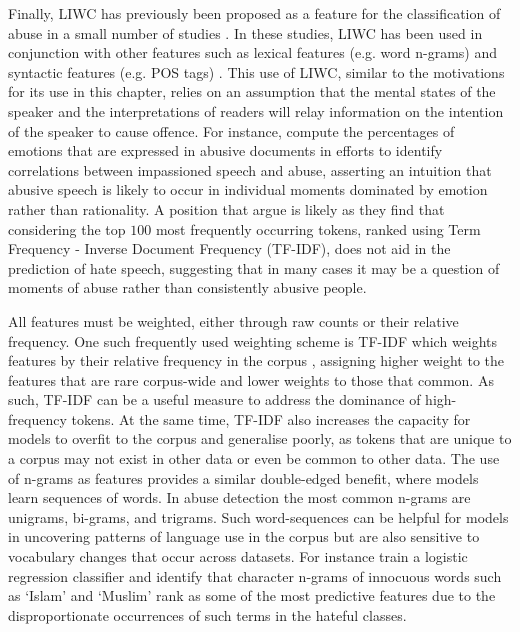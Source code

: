 Finally, LIWC has previously been proposed as a feature for the classification of abuse in a small number of studies \citep{Nina-Alcocer:2019,Joksimovic:2019}. In these studies, LIWC has been used in conjunction with other features such as lexical features (e.g. word n-grams) and syntactic features (e.g. POS tags) \citep{Joksimovic:2019}. This use of LIWC, similar to the motivations for its use in this chapter, relies on an assumption that the mental states of the speaker and the interpretations of readers will relay information on the intention of the speaker to cause offence. For instance, \citet{Nina-Alcocer:2019} compute the percentages of emotions that are expressed in abusive documents in efforts to identify correlations between impassioned speech and abuse, asserting an intuition that abusive speech is likely to occur in individual moments dominated by emotion rather than rationality. A position that \citep{Waseem:2016} argue is likely as they find that considering the top $100$ most frequently occurring tokens, ranked using Term Frequency - Inverse Document Frequency (TF-IDF), does not aid in the prediction of hate speech, suggesting that in many cases it may be a question of moments of abuse rather than consistently abusive people.

All features must be weighted, either through raw counts or their relative frequency. One such frequently used weighting scheme is TF-IDF which weights features by their relative frequency in the corpus \citep{Fortuna:2018}, assigning higher weight to the features that are rare corpus-wide and lower weights to those that common. As such, TF-IDF can be a useful measure to address the dominance of high-frequency tokens. At the same time, TF-IDF also increases the capacity for models to overfit to the corpus and generalise poorly, as tokens that are unique to a corpus may not exist in other data or even be common to other data. The use of n-grams as features provides a similar double-edged benefit, where models learn sequences of words. In abuse detection the most common n-grams are unigrams, bi-grams, and trigrams. Such word-sequences can be helpful for models in uncovering patterns of language use in the corpus but are also sensitive to vocabulary changes that occur across datasets. For instance \citet{Waseem-Hovy:2016} train a logistic regression classifier and identify that character n-grams of innocuous words such as `Islam' and `Muslim' rank as some of the most predictive features due to the disproportionate occurrences of such terms in the hateful classes.


